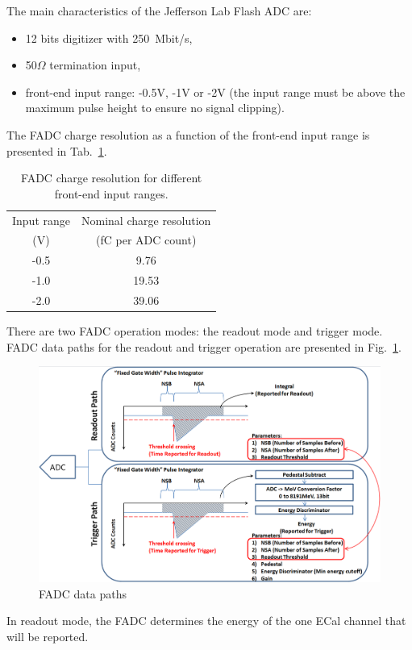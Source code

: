 The main characteristics of the Jefferson Lab Flash ADC are:
\begin{itemize}
\item 12 bits digitizer with 250~Mbit/s, 
\item 50$\Omega$ termination input, 
\item front-end input range:  -0.5V, -1V or -2V (the input range must be above the maximum pulse height to 
ensure no signal clipping).
\end{itemize}
The FADC charge resolution as a function of the front-end input range is presented in 
Tab.~\ref{tab:charge_resolution}.
\begin{table}[h]
\centering
\begin{tabular}{|c|c|}
\hline
Input range & Nominal charge resolution\\
(V) & (fC per ADC count)\\\hline
-0.5 & 9.76  \\\hline
-1.0 & 19.53  \\\hline
-2.0 & 39.06 \\\hline
\end{tabular}
\caption{FADC charge resolution for different front-end input ranges.}
\label{tab:charge_resolution}
\end{table}
There are two FADC operation modes: the readout mode and trigger mode.
FADC data paths for the readout and trigger operation are presented in Fig.~\ref{fig:hps_trigger_data}.
\begin{figure}[t]
\includegraphics[scale=0.4]{daq_trigger/figures/hps_trigger_data}
\caption{\small{FADC data paths}}
\label{fig:hps_trigger_data}
\end{figure}
In readout mode, the FADC determines the energy of the one ECal channel that will be reported. 
